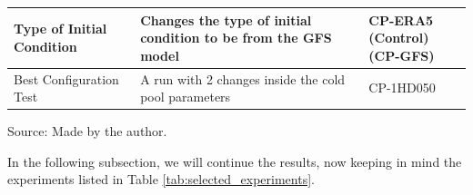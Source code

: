 \begin{table}[H]
{\begin{tabular}{
				>{\centering\arraybackslash}m{4cm}
				>{\centering\arraybackslash}m{9cm}
				>{\centering\arraybackslash}m{4cm}
			}
			Type of Initial Condition 
			& Changes the type of initial condition to be from the GFS model 
			& \makecell[l]{CP-ERA5 (Control)\\(CP-GFS)} \\
			\midrule
			
			Best Configuration Test 
			& A run with 2 changes inside the cold pool parameters 
			& CP-1HD050 \\
			\bottomrule
		\end{tabular}
	}
	
	\vspace{2mm}
	{\centering Source: Made by the author.\par}
\end{table}

In the following subsection, we will continue the results, now keeping in mind the experiments listed in Table \ref{tab:selected_experiments}.






